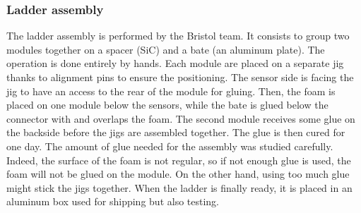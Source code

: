 
    \subsubsection{Ladder assembly}

    The ladder assembly is performed by the Bristol team.
    It consists to group two modules together on a spacer (\gls{SiC}) and a bate (an aluminum plate).
    The operation is done entirely by hands.
    Each module are placed on a separate jig thanks to alignment pins to ensure the positioning.
    The sensor side is facing the jig to have an access to the rear of the module for gluing.
    Then, the foam is placed on one module below the sensors, while the bate is glued below the connector with and overlaps the foam.
    The second module receives some glue on the backside before the jigs are assembled together.
    The glue is then cured for one day.
    The amount of glue needed for the assembly was studied carefully. 
    Indeed, the surface of the foam is not regular, so if not enough glue is used, the foam will not be glued on the module.
    On the other hand, using too much glue might stick the jigs together.
    When the ladder is finally ready, it is placed in an aluminum box used for shipping but also testing.
   
